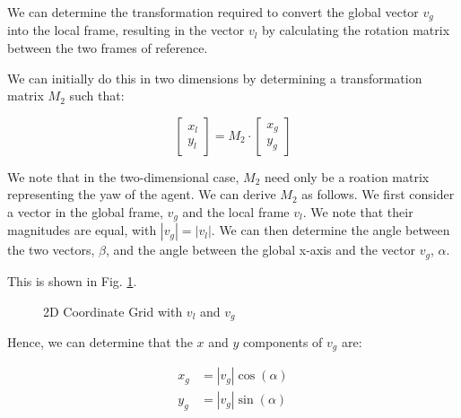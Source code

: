 \documentclass[12pt]{article}
\begin{document}
We can determine the transformation required to convert the global vector $v_g$ into the local frame, resulting in the vector $v_l$ by calculating the rotation matrix between the two frames of reference.

We can initially do this in two dimensions by determining a transformation matrix $M_2$ such that:

\begin{equation}
    \begin{bmatrix}
    x_l \\
    y_l
    \end{bmatrix}
    = M_2 \cdot
    \begin{bmatrix}
    x_g \\
    y_g
    \end{bmatrix}
\label{eq:basis-transformation2}
\end{equation}

We note that in the two-dimensional case, $M_2$ need only be a roation matrix representing the yaw of the agent. We can derive $M_2$ as follows. We first consider a vector in the global frame, $v_g$ and the local frame $v_l$. We note that their magnitudes are equal, with $|v_g| = |v_l|$. We can then determine the angle between the two vectors, $\beta$, and the angle between the global x-axis and the vector $v_g$, $\alpha$.

This is shown in Fig. \ref{fig:2d-rotation}.

\begin{figure}[H]
    \centering
    \caption{2D Coordinate Grid with $v_l$ and $v_g$}
    \label{fig:2d-rotation}
\end{figure}

Hence, we can determine that the $x$ and $y$ components of $v_g$ are:

\begin{equation}
    \begin{aligned}
        x_g &= |v_g| \cos(\alpha) \\
        y_g &= |v_g| \sin(\alpha)
    \end{aligned}
\end{equation}
\end{document}
